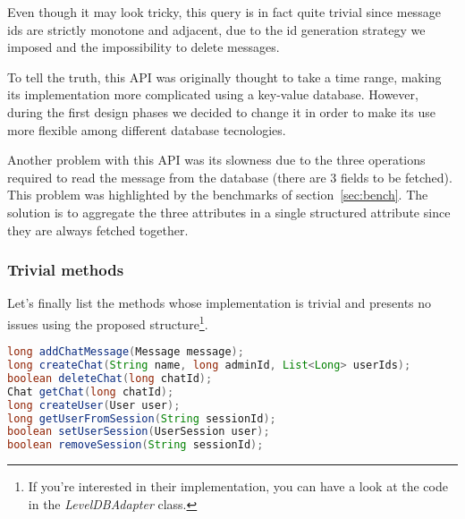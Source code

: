 \documentclass[10pt]{article}
\begin{document}
Even though it may look tricky, this query is in fact quite trivial since 
message ids are strictly monotone and adjacent, due to the id generation 
strategy we imposed and the impossibility to delete messages.

To tell the truth, this API was originally thought to take a time range, making its 
implementation more complicated using a key-value database. However, during the
first design phases we decided to change it in order to make its use more 
flexible among different database tecnologies.

Another problem with this API was its slowness due to the three
operations required to read the message from the database (there are 
3 fields to be fetched). This problem was highlighted by the benchmarks
of section~\ref{sec:bench}. The solution is to aggregate the three attributes 
in a single structured attribute since they are always fetched together.

\subsubsection{Trivial methods}
Let's finally list the 
methods whose implementation is trivial and presents no issues using the
proposed structure\footnote{If you're interested in their implementation, you 
can have a look at the code in the \emph{LevelDBAdapter} class.}. 

\begin{lstlisting}[language = Java]
long addChatMessage(Message message);
long createChat(String name, long adminId, List<Long> userIds);
boolean deleteChat(long chatId);
Chat getChat(long chatId);
long createUser(User user);
long getUserFromSession(String sessionId);
boolean setUserSession(UserSession user);
boolean removeSession(String sessionId);
\end{lstlisting}
\end{document}
